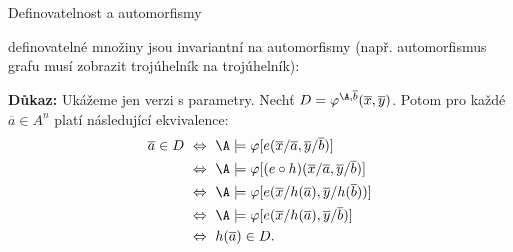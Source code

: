 \documentclass{beamer}
\begin{document}
\begin{frame}{Definovatelnost a automorfismy}

    \pause
    definovatelné množiny jsou \alert{invariantní} na automorfismy (např. automorfismus grafu musí zobrazit trojúhelník na trojúhelník):

    \medskip

    \pause

    \pause
    \textbf{Důkaz:}
    Ukážeme jen verzi s parametry. Nechť $D=\varphi^{\A,\overline{b}}(\overline{x},\overline{y})$. Potom pro každé $\overline{a}\in A^n$ platí následující ekvivalence:\pause
    \begin{align*}
    \overline{a}\in D\ 
    &\Leftrightarrow\ \A\models \varphi[e(\overline{x}/\overline{a},\overline{y}/\overline{b})]\\
    &\Leftrightarrow\  \A\models \varphi[(e\circ h)(\overline{x}/\overline{a},\overline{y}/\overline{b})]\\
    &\Leftrightarrow\ \A\models \varphi[e(\overline{x}/h(\overline{a}),\overline{y}/h(\overline{b}))]\\
    &\Leftrightarrow\ \A\models \varphi[e(\overline{x}/h(\overline{a}),\overline{y}/\overline{b})]\\
    &\Leftrightarrow\ h(\overline{a})\in D.
    \end{align*}

    \vspace{-0.85cm}
    \hfill\qedsymbol    

\end{frame}
\end{document}
